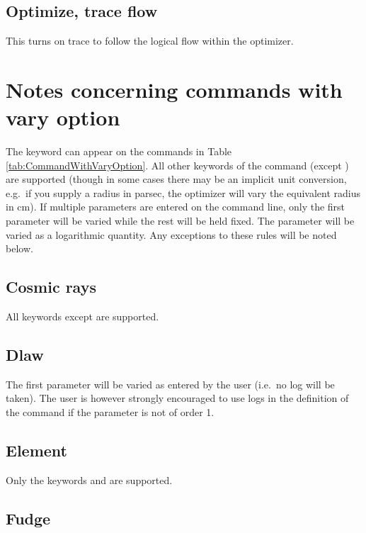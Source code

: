 \subsection{Optimize, trace flow}

This turns on trace to follow the logical flow within the optimizer.

\section{Notes concerning commands with vary option}
\label{sec:CommandWithVary_notes}

The keyword  can appear on the commands in Table
\ref{tab:CommandWithVaryOption}. All other keywords of the command (except
) are supported (though in some cases there may be an
implicit unit conversion, e.g.\ if you supply a radius in parsec, the
optimizer will vary the equivalent radius in cm). If multiple parameters are
entered on the command line, only the first parameter will be varied while the
rest will be held fixed. The parameter will be varied as a logarithmic
quantity. Any exceptions to these rules will be noted below.

\subsection{Cosmic rays}

All keywords except  are supported.

\subsection{Dlaw}

The first parameter will be varied as entered by the user (i.e.\ no log will
be taken). The user is however strongly encouraged to use logs in the
definition of the command if the parameter is not of order 1.

\subsection{Element}

Only the keywords  and  are supported.

\subsection{Fudge}

